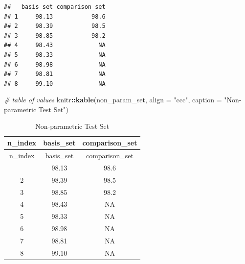 \documentclass[
  12pt,
  a4paper,
]{article}
\newenvironment{Shaded}{\begin{snugshade}}{\end{snugshade}}
\newcommand{\AttributeTok}[1]{\textcolor[rgb]{0.13,0.29,0.53}{#1}}
\newcommand{\CommentTok}[1]{\textcolor[rgb]{0.56,0.35,0.01}{\textit{#1}}}
\newcommand{\DecValTok}[1]{\textcolor[rgb]{0.00,0.00,0.81}{#1}}
\newcommand{\FunctionTok}[1]{\textcolor[rgb]{0.13,0.29,0.53}{\textbf{#1}}}
\newcommand{\NormalTok}[1]{#1}
\newcommand{\SpecialCharTok}[1]{\textcolor[rgb]{0.81,0.36,0.00}{\textbf{#1}}}
\newcommand{\StringTok}[1]{\textcolor[rgb]{0.31,0.60,0.02}{#1}}
\numberwithin{equation}{section}
\theoremstyle{plain}
\theoremstyle{definition}
\theoremstyle{remark}
\theoremstyle{note}
\begin{document}
\begin{verbatim}
##   basis_set comparison_set
## 1     98.13           98.6
## 2     98.39           98.5
## 3     98.85           98.2
## 4     98.43             NA
## 5     98.33             NA
## 6     98.98             NA
## 7     98.81             NA
## 8     99.10             NA
\end{verbatim}

\newpage

\begin{Shaded}
\begin{Highlighting}[]
\CommentTok{\# table of values}
\NormalTok{knitr}\SpecialCharTok{::}\FunctionTok{kable}\NormalTok{(non\_param\_set, }\AttributeTok{align =} \StringTok{"ccc"}\NormalTok{, }\AttributeTok{caption =} \StringTok{"Non{-}parametric Test Set"}\NormalTok{)}
\end{Highlighting}
\end{Shaded}

\begin{longtable}[]{@{}ccc@{}}
\caption{Non-parametric Test Set}\tabularnewline
\toprule\noalign{}
n\_index & basis\_set & comparison\_set \\
\midrule\noalign{}
\endfirsthead
\toprule\noalign{}
n\_index & basis\_set & comparison\_set \\
\midrule\noalign{}
\endhead
\bottomrule\noalign{}
\endlastfoot
1 & 98.13 & 98.6 \\
2 & 98.39 & 98.5 \\
3 & 98.85 & 98.2 \\
4 & 98.43 & NA \\
5 & 98.33 & NA \\
6 & 98.98 & NA \\
7 & 98.81 & NA \\
8 & 99.10 & NA \\
\end{longtable}

\begin{Shaded}
\end{Shaded}
\end{document}
